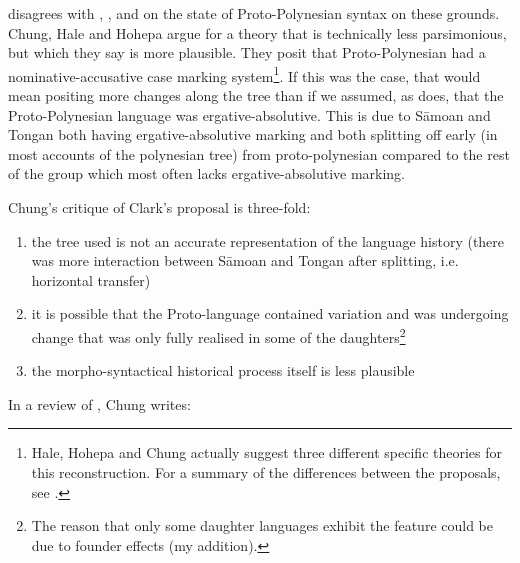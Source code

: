 \documentclass[a4paper,10pt]{article} %
\begin{document}
\citet{clark1976aspects} disagrees with \citet{hale_1968}, \citet{hohepa_1969}, and \citet{chung1978} on the state of Proto-Polynesian syntax on these grounds. Chung, Hale and Hohepa argue for a theory that is technically less parsimonious, but which they say is more plausible. They posit that Proto-Polynesian had a nominative-accusative case marking system\footnote{Hale, Hohepa and Chung actually suggest three different specific theories for this reconstruction. For a summary of the differences between the proposals, see \citet[247-249]{chung1978}.}. If this was the case, that would mean positing more changes along the tree than if we assumed, as \citet{clark1976aspects} does, that the Proto-Polynesian language was ergative-absolutive. This is due to S\={a}moan and Tongan both having ergative-absolutive marking and both splitting off early (in most accounts of the polynesian tree) from proto-polynesian compared to the rest of the group which most often lacks ergative-absolutive marking.

Chung's critique of Clark's proposal is three-fold: 
\begin{enumerate}[label=(\alph*)]
\item the tree used is not an accurate representation of the language history (there was more interaction between S\={a}moan and Tongan after splitting, i.e. horizontal transfer)
\item it is possible that the Proto-language contained variation and was undergoing change that was only fully realised in some of the daughters\footnote{The reason that only some daughter languages exhibit the feature could be due to founder effects (my addition).} 
\item the morpho-syntactical historical process itself is less plausible
\end{enumerate}

In a review of \citet{clark1976aspects}, Chung writes:
\end{document}
